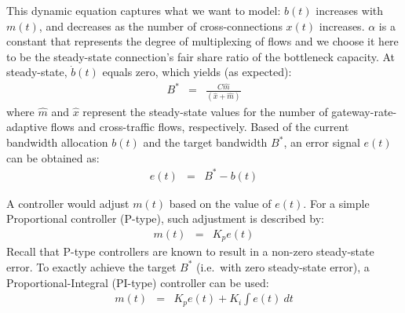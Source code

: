 \documentclass{article}
\begin{document}
\noindent 
This dynamic equation captures what we want to model:
$b(t)$ increases with $m(t)$, and decreases
as the number of cross-connections $x(t)$ increases. 
$\alpha$ is a constant that represents the degree of multiplexing of
flows and we choose it here to be the steady-state connection's fair share
ratio of the bottleneck capacity. 
At steady-state,
$\dot b(t)$ equals zero, which yields (as expected):
\begin{eqnarray*} 
 \label{eqn:m_x_ss}    
   B^* &=&   \frac{C \hat m} {(\hat x+\hat m)}
\end{eqnarray*}
where $\hat m$ and $\hat x$ represent the steady-state values for the
number of gateway-rate-adaptive flows and cross-traffic flows, respectively.
\noindent
Based of the current bandwidth allocation $b(t)$ and the target
bandwidth $B^*$, an error signal $e(t)$ can be obtained as:
\begin{eqnarray*} 
 \label{eqn:e}    
   e(t) &=&   B^* - b(t)
\end{eqnarray*}

A controller would adjust $m(t)$ based on the value
of $e(t)$. 
For a simple
Proportional controller (P-type), such adjustment is described by:
\begin{eqnarray} 
 \label{eqn:p}    
   m(t) &=&  K_p e(t)
\end{eqnarray}
\noindent
Recall that P-type controllers are known to result in a non-zero steady-state error.
To exactly achieve the target $B^*$ (i.e.\ with zero steady-state error),
a Proportional-Integral (PI-type) controller can be used:
\begin{eqnarray} 
 \label{eqn:pi}    
   m(t) &=& K_p e(t)+ K_i \int e(t) \ dt
\end{eqnarray}
\end{document}
